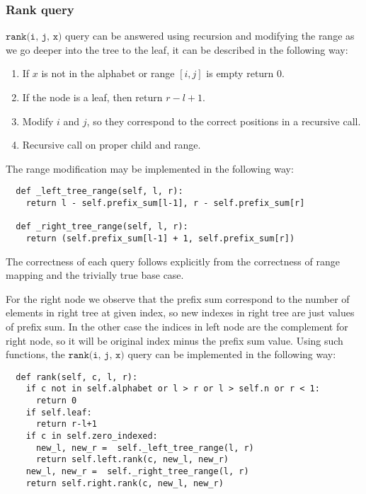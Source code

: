 \subsubsection{Rank query}
$\texttt{rank(i, j, x)}$ query can be answered using recursion and modifying the range as we go deeper into the tree to the leaf, it can be described in the following way:

\begin{enumerate}
    \item If $x$ is not in the alphabet or range $[i,j]$ is empty return $0$.
    \item If the node is a leaf, then return $r-l+1$.
    \item Modify $i$ and $j$, so they correspond to the correct positions in a recursive call.
    \item Recursive call on proper child and range.
\end{enumerate}

The range modification may be implemented in the following way:
\begin{verbatim}
  def _left_tree_range(self, l, r):
    return l - self.prefix_sum[l-1], r - self.prefix_sum[r]

  def _right_tree_range(self, l, r):
    return (self.prefix_sum[l-1] + 1, self.prefix_sum[r])
\end{verbatim}

The correctness of each query follows explicitly from the correctness of range mapping and the trivially true base case.

For the right node we observe that the prefix sum correspond to the number of elements in right tree at given index, so new indexes in right tree are just values of prefix sum. In the other case the indices in left node are the complement for right node, so it will be original index minus the prefix sum value. Using such functions, the $\texttt{rank(i, j, x)}$ query can be implemented in the following way:

\begin{verbatim}
  def rank(self, c, l, r):
    if c not in self.alphabet or l > r or l > self.n or r < 1:
      return 0
    if self.leaf:
      return r-l+1
    if c in self.zero_indexed:
      new_l, new_r =  self._left_tree_range(l, r)
      return self.left.rank(c, new_l, new_r)
    new_l, new_r =  self._right_tree_range(l, r)
    return self.right.rank(c, new_l, new_r)
\end{verbatim}

